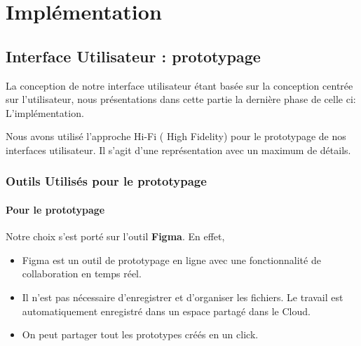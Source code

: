 
\chapter{Implémentation}
\label{chp:impl}




\section{Interface Utilisateur : prototypage}

La conception de notre interface utilisateur étant basée sur la conception centrée sur l'utilisateur, nous présentations dans cette partie la dernière phase de celle ci: L'implémentation.

Nous avons utilisé l'approche Hi-Fi ( High Fidelity) pour le prototypage de nos interfaces utilisateur. Il s'agit d'une représentation avec un maximum de détails.
\subsection{Outils Utilisés pour le prototypage}
\subsubsection{Pour le prototypage}
Notre choix s'est porté sur l'outil \textbf{Figma}. En effet,
\begin{itemize}
    \item Figma est un outil de prototypage en ligne avec une fonctionnalité de collaboration en temps réel.
    \item Il n'est pas nécessaire d'enregistrer et d'organiser les fichiers. Le travail est automatiquement enregistré dans un espace partagé dans le Cloud.
    \item On peut partager tout les prototypes créés en un click.
\end{itemize}

